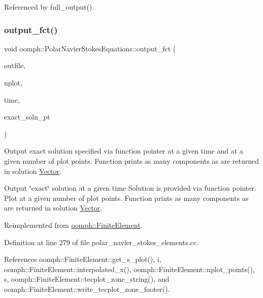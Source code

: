Referenced by full\+\_\+output().

\mbox{\label{classoomph_1_1PolarNavierStokesEquations_a89353546dd511060090ef8f3e70e840a}} 
\subsubsection{\texorpdfstring{output\+\_\+fct()}{output\_fct()}\hspace{0.1cm}{\footnotesize\ttfamily [2/2]}}
{\footnotesize\ttfamily void oomph\+::\+Polar\+Navier\+Stokes\+Equations\+::output\+\_\+fct (\begin{DoxyParamCaption}\item[{std\+::ostream \&}]{outfile,  }\item[{const unsigned \&}]{nplot,  }\item[{const double \&}]{time,  }\item[{\hyperlink{classoomph_1_1FiniteElement_ad4ecf2b61b158a4b4d351a60d23c633e}{Finite\+Element\+::\+Unsteady\+Exact\+Solution\+Fct\+Pt}}]{exact\+\_\+soln\+\_\+pt }\end{DoxyParamCaption})\hspace{0.3cm}{\ttfamily [virtual]}}



Output exact solution specified via function pointer at a given time and at a given number of plot points. Function prints as many components as are returned in solution \hyperlink{classoomph_1_1Vector}{Vector}. 

Output \char`\"{}exact\char`\"{} solution at a given time Solution is provided via function pointer. Plot at a given number of plot points. Function prints as many components as are returned in solution \hyperlink{classoomph_1_1Vector}{Vector}. 

Reimplemented from \hyperlink{classoomph_1_1FiniteElement_a2a8426dccd57b927be0ae0eec00d0479}{oomph\+::\+Finite\+Element}.



Definition at line 279 of file polar\+\_\+navier\+\_\+stokes\+\_\+elements.\+cc.



References oomph\+::\+Finite\+Element\+::get\+\_\+s\+\_\+plot(), i, oomph\+::\+Finite\+Element\+::interpolated\+\_\+x(), oomph\+::\+Finite\+Element\+::nplot\+\_\+points(), s, oomph\+::\+Finite\+Element\+::tecplot\+\_\+zone\+\_\+string(), and oomph\+::\+Finite\+Element\+::write\+\_\+tecplot\+\_\+zone\+\_\+footer().

